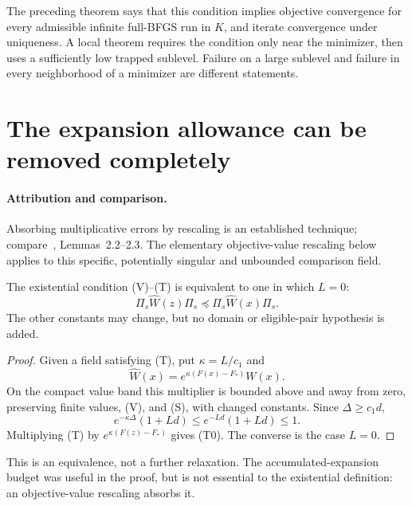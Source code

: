 The preceding theorem says that this condition implies objective convergence for every admissible infinite full-BFGS run in $K$, and iterate convergence under uniqueness. A local theorem requires the condition only near the minimizer, then uses a sufficiently low trapped sublevel. Failure on a large sublevel and failure in every neighborhood of a minimizer are different statements.


\setcounter{section}{1}
\setcounter{theorem}{0}
\setcounter{equation}{1}
\section{The expansion allowance can be removed completely}
\paragraph{Attribution and comparison.}
Absorbing multiplicative errors by rescaling is an established technique; compare~\cite{FND_CV13}, Lemmas~2.2--2.3. The elementary objective-value rescaling below applies to this specific, potentially singular and unbounded comparison field.

\begin{proposition}
The existential condition (V)--(T) is equivalent to one in which $L=0$:
\begin{equation}
 \Pi_s\widehat W(z)\Pi_s\preceq\Pi_s\widehat W(x)\Pi_s. \tag{G.T0}
\end{equation}
The other constants may change, but no domain or eligible-pair hypothesis is added.
\end{proposition}
\begin{proof}
Given a field satisfying (T), put $\kappa=L/c_1$ and
\[
 \widehat W(x)=e^{\kappa(F(x)-F_*)}W(x).
\]
On the compact value band this multiplier is bounded above and away from zero, preserving finite values, (V), and (S), with changed constants. Since $\Delta\ge c_1d$,
\[
 e^{-\kappa\Delta}(1+Ld)\le e^{-Ld}(1+Ld)\le1.
\]
Multiplying (T) by $e^{\kappa(F(z)-F_*)}$ gives (T0). The converse is the case $L=0$.
\end{proof}
This is an equivalence, not a further relaxation. The accumulated-expansion budget was useful in the proof, but is not essential to the existential definition: an objective-value rescaling absorbs it.

